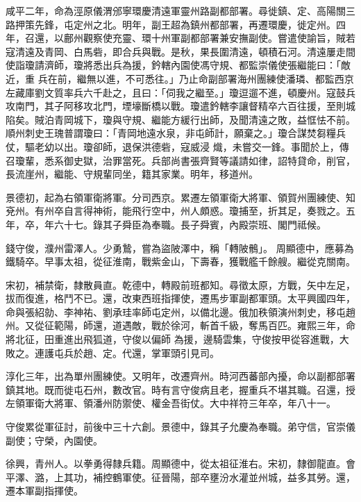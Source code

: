 \begin{pinyinscope}
 咸平二年，命為涇原儀渭邠寧環慶清遠軍靈州路副都部署。尋徙鎮、定、高陽關三路押策先鋒，屯定州之北。明年，副王超為鎮州都部署，再遷環慶，徙定州。四年，召還，以鄜州觀察使充靈、環十州軍副都部署兼安撫副使。嘗遣使諭旨，賊若寇清遠及青岡、白馬砦，即合兵與戰。是秋，果長圍清遠，頓積石河。清遠屢走間使詣瓊請濟師，瓊將悉出兵為援，鈐轄內園使馮守規、都監崇儀使張繼能曰：「敵近，重
 兵在前，繼無以進，不可悉往。」乃止命副部署海州團練使潘璘、都監西京左藏庫劉文質率兵六千赴之，且曰：「伺我之繼至。」瓊逗遛不進，頓慶州。寇鼓兵攻南門，其子阿移攻北門，堙壕斷橋以戰。瓊遣鈐轄李讓督精卒六百往援，至則城陷矣。賊泊青岡城下，瓊與守規、繼能方緩行出師，及聞清遠之敗，益恇怯不前。順州刺史王瑰普謂瓊曰：「青岡地遠水泉，非屯師計，願棄之。」瓊合謀焚芻糧兵仗，驅老幼以出。瓊卻師，退保洪德砦，寇威浸
 熾，未嘗交一鋒。事聞於上，傳召瓊輩，悉系御史獄，治罪當死。兵部尚書張齊賢等議請如律，詔特貸命，削官，長流崖州，繼能、守規輩同坐，籍其家業。明年，移道州。



 景德初，起為右領軍衛將軍。分司西京。累遷左領軍衛大將軍、領賀州團練使、知兗州。有州卒自言得神術，能飛行空中，州人頗惑。瓊捕至，折其足，奏戮之。五年，卒，年六十七。錄其子舜臣為奉職。長子舜賓，內殿崇班、閣門祗候。



 錢守俊，濮州雷澤人。少勇鷙，嘗為盜陂澤中，稱「轉陂鶻」。
 周顯德中，應募為鐵騎卒。早事太祖，從征淮南，戰紫金山，下壽春，獲戰艦千餘艘。繼從克關南。



 宋初，補禁衛，隸散員直。乾德中，轉殿前班都知。尋徵太原，方戰，矢中左足，拔而復進，格鬥不已。還，改東西班指揮使，遷馬步軍副都軍頭。太平興國四年，命與張紹勍、李神祐、劉承珪率師屯定州，以備北邊。俄加秩領演州刺史，移屯趙州。又從征範陽，師還，道遇敵，戰於徐河，斬首千級，奪馬百匹。雍熙三年，命將北征，田重進出飛狐道，守俊以偏師
 為援，邊騎雲集，守俊按甲從容進戰，大敗之。連護屯兵於趙、定。代還，掌軍頭引見司。



 淳化三年，出為單州團練使。又明年，改遷齊州。時河西蕃部內擾，命以副都部署鎮其地。既而徙屯石州，數改官。時有言守俊病且老，握重兵不堪其職。召還，授左領軍衛大將軍、領潘州防禦使、權金吾街仗。大中祥符三年卒，年八十一。



 守俊累從軍征討，前後中三十六創。景德中，錄其子允慶為奉職。弟守信，官崇儀副使；守榮，內園使。



 徐興，青州人。以拳勇得隸兵籍。周顯德中，從太祖征淮右。宋初，隸御龍直。會平澤、潞，上其功，補控鶴軍使。征晉陽，部卒壅汾水灌並州城，益多其勞。還，遷本軍副指揮使。




\end{pinyinscope}
